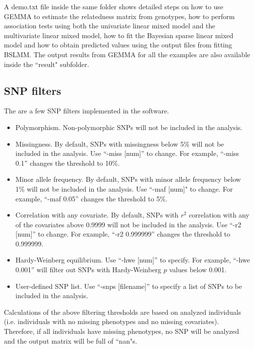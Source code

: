 \documentclass[11pt]{article}
\begin{document}
A demo.txt file inside the same folder shows detailed steps on how to
use GEMMA to estimate the relatedness matrix from genotypes, how to
perform association tests using both the univariate linear mixed model
and the multivariate linear mixed model, how to fit the Bayesian
sparse linear mixed model and how to obtain predicted values using the
output files from fitting BSLMM. The output results from GEMMA for all
the examples are also available inside the ``result" subfolder.

\subsection{SNP filters}

The are a few SNP filters implemented in the software.

\begin{itemize}

\item Polymorphism. Non-polymorphic SNPs will not be included in the
  analysis.

\item Missingness. By default, SNPs with missingness below 5\% will
  not be included in the analysis. Use ``-miss [num]'' to change. For
  example, ``-miss 0.1'' changes the threshold to 10\%.

\item Minor allele frequency. By default, SNPs with minor allele
  frequency below 1\% will not be included in the analysis. Use ``-maf
  [num]" to change. For example, ``-maf 0.05'' changes the threshold
  to 5\%.

\item Correlation with any covariate. By default, SNPs with $r^2$
  correlation with any of the covariates above 0.9999 will not be
  included in the analysis. Use ``-r2 [num]'' to change. For example,
  ``-r2 0.999999'' changes the threshold to 0.999999.

\item Hardy-Weinberg equilibrium. Use ``-hwe [num]'' to specify. For
  example, ``-hwe 0.001'' will filter out SNPs with Hardy-Weinberg $p$
  values below 0.001.

\item User-defined SNP list. Use ``-snps [filename]'' to specify a
  list of SNPs to be included in the analysis.

\end{itemize}

Calculations of the above filtering thresholds are based on analyzed
individuals (i.e. individuals with no missing phenotypes and no
missing covariates). Therefore, if all individuals have missing
phenotypes, no SNP will be analyzed and the output matrix will be full
of ``nan"s.
\end{document}
